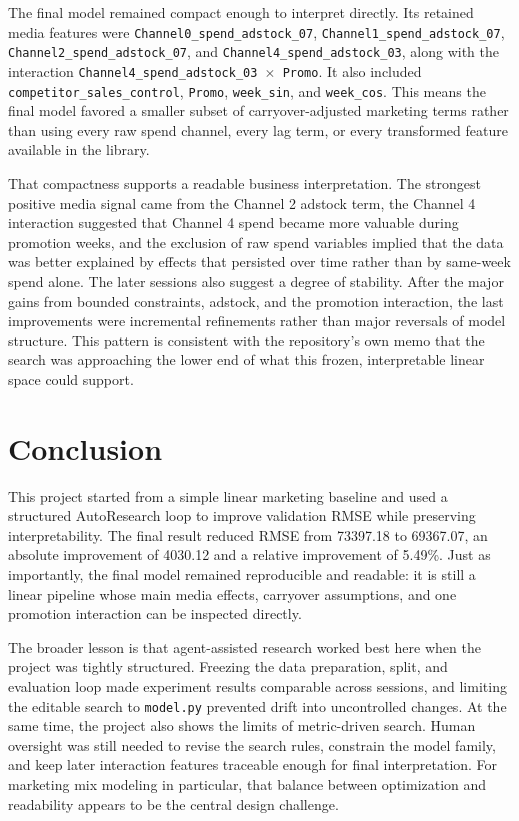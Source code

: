 \documentclass{article}
\begin{document}
The final model remained compact enough to interpret directly. Its retained media features were \texttt{Channel0\_spend\_adstock\_07}, \texttt{Channel1\_spend\_adstock\_07}, \texttt{Channel2\_spend\_adstock\_07}, and \texttt{Channel4\_spend\_adstock\_03}, along with the interaction \texttt{Channel4\_spend\_adstock\_03 $\times$ Promo}. It also included \texttt{competitor\_sales\_control}, \texttt{Promo}, \texttt{week\_sin}, and \texttt{week\_cos}. This means the final model favored a smaller subset of carryover-adjusted marketing terms rather than using every raw spend channel, every lag term, or every transformed feature available in the library.

That compactness supports a readable business interpretation. The strongest positive media signal came from the Channel 2 adstock term, the Channel 4 interaction suggested that Channel 4 spend became more valuable during promotion weeks, and the exclusion of raw spend variables implied that the data was better explained by effects that persisted over time rather than by same-week spend alone. The later sessions also suggest a degree of stability. After the major gains from bounded constraints, adstock, and the promotion interaction, the last improvements were incremental refinements rather than major reversals of model structure. This pattern is consistent with the repository's own memo that the search was approaching the lower end of what this frozen, interpretable linear space could support.

\section{Conclusion}

This project started from a simple linear marketing baseline and used a structured AutoResearch loop to improve validation RMSE while preserving interpretability. The final result reduced RMSE from 73397.18 to 69367.07, an absolute improvement of 4030.12 and a relative improvement of 5.49\%. Just as importantly, the final model remained reproducible and readable: it is still a linear pipeline whose main media effects, carryover assumptions, and one promotion interaction can be inspected directly.

The broader lesson is that agent-assisted research worked best here when the project was tightly structured. Freezing the data preparation, split, and evaluation loop made experiment results comparable across sessions, and limiting the editable search to \texttt{model.py} prevented drift into uncontrolled changes. At the same time, the project also shows the limits of metric-driven search. Human oversight was still needed to revise the search rules, constrain the model family, and keep later interaction features traceable enough for final interpretation. For marketing mix modeling in particular, that balance between optimization and readability appears to be the central design challenge.

\end{document}
